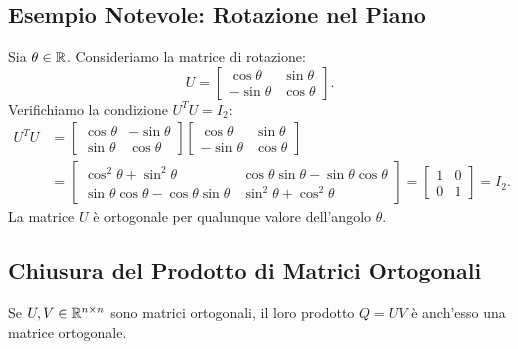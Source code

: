\subsection{Esempio Notevole: Rotazione nel Piano}

\begin{example}
Sia $\theta \in \mathbb{R}$. Consideriamo la matrice di rotazione:
\begin{equation}
    U = \begin{bmatrix} \cos\theta & \sin\theta \\ -\sin\theta & \cos\theta \end{bmatrix}.
\end{equation}
Verifichiamo la condizione $U^T U = I_2$:
\begin{align}
    U^T U &= \begin{bmatrix} \cos\theta & -\sin\theta \\ \sin\theta & \cos\theta \end{bmatrix} \begin{bmatrix} \cos\theta & \sin\theta \\ -\sin\theta & \cos\theta \end{bmatrix} \nonumber \\
    &= \begin{bmatrix}
        \cos^2\theta + \sin^2\theta & \cos\theta\sin\theta - \sin\theta\cos\theta \\
        \sin\theta\cos\theta - \cos\theta\sin\theta & \sin^2\theta + \cos^2\theta
    \end{bmatrix} = \begin{bmatrix} 1 & 0 \\ 0 & 1 \end{bmatrix} = I_2.
\end{align}
La matrice $U$ \`e ortogonale per qualunque valore dell'angolo $\theta$.
\end{example}

\subsection{Chiusura del Prodotto di Matrici Ortogonali}

\begin{proposition}
Se $U, V \in \mathbb{R}^{n \times n}$ sono matrici ortogonali, il loro prodotto $Q = UV$ \`e anch'esso una matrice ortogonale.
\end{proposition}

